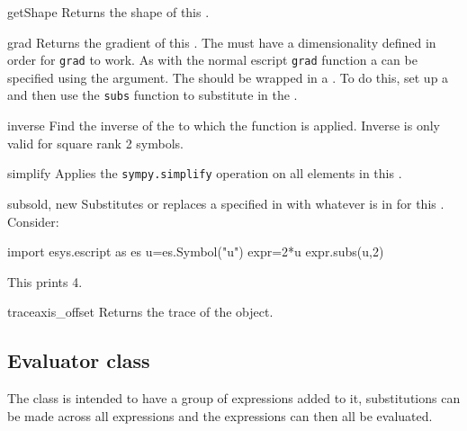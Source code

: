 \begin{methoddesc}[Symbol]{getShape}{}
Returns the shape of this \SYMBOL.
\end{methoddesc}
\begin{methoddesc}[Symbol]{grad}{}
Returns the gradient of this \SYMBOL. The \SYMBOL must have a dimensionality
defined in order for \texttt{grad} to work. As with the normal escript
\texttt{grad} function a \FunctionSpace can be specified using the
 argument. The \FunctionSpace should be wrapped in a \SYMBOL.
To do this, set up a \SYMBOL and then use the \texttt{subs} function to
substitute in the \FunctionSpace.
\end{methoddesc}
\begin{methoddesc}[Symbol]{inverse}{}
Find the inverse of the \SYMBOL to which the function is applied. Inverse is only valid for square rank 2 symbols.
\end{methoddesc}
\begin{methoddesc}[Symbol]{simplify}{}
Applies the \texttt{sympy.simplify} operation on all elements in this \SYMBOL.
\end{methoddesc}
\begin{methoddesc}[Symbol]{subs}{old, new}
Substitutes or replaces a \SYMBOL specified in  with whatever is in
 for this \SYMBOL. Consider:
  \begin{python}
     import esys.escript as es
     u=es.Symbol("u")
     expr=2*u
     expr.subs(u,2)
\end{python}
This prints 4.
\end{methoddesc}
\begin{methoddesc}[Symbol]{trace}{axis_offset}
Returns the trace of the \SYMBOL object.
\end{methoddesc}

\subsection{Evaluator class}
The \EVALUATOR class is intended to have a group of expressions added to it,
substitutions can be made across all expressions and the expressions can then
all be evaluated.
